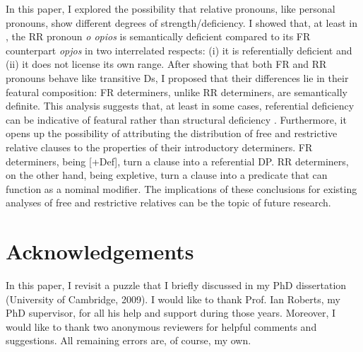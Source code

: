 \documentclass[output=paper]{langsci/langscibook}
\begin{document}
In this paper, I explored the possibility that relative pronouns, like personal
pronouns, show different degrees of strength/deficiency. I showed that, at
least in , the \gls{RR} pronoun \emph{o opios} is semantically deficient
compared to its \gls{FR} counterpart \emph{opjos} in two interrelated respects:
(i) it is referentially deficient and (ii) it does not license its own range.
After showing that both \gls{FR} and \gls{RR} pronouns behave like transitive
Ds, I proposed that their differences lie in their featural composition:
\gls{FR} determiners, unlike \gls{RR} determiners, are semantically definite. This
analysis suggests that, at least in some cases, referential deficiency can be
indicative of featural rather than structural deficiency
\parencite[cf.][]{CarSta1999,DecWil2002}.  Furthermore, it opens up the
possibility of attributing the distribution of free and restrictive relative
clauses to the properties of their introductory determiners. \gls{FR}
determiners, being [+Def], turn a clause into a referential DP. \gls{RR}
determiners, on the other hand, being expletive, turn a clause into a predicate
that can function as a nominal modifier. The implications of these conclusions
for existing analyses of free and restrictive relatives can be the topic of
future research.

\printchapterglossary{}

\section*{Acknowledgements}

In this paper, I revisit a puzzle that I briefly discussed in my PhD
dissertation (University of Cambridge, 2009). I would like to thank Prof. Ian
Roberts, my PhD supervisor, for all his help and support during those years.
Moreover, I would like to thank two anonymous reviewers for helpful comments
and suggestions. All remaining errors are, of course, my own.

{\sloppy\printbibliography[heading=subbibliography,notkeyword=this]}
\end{document}
